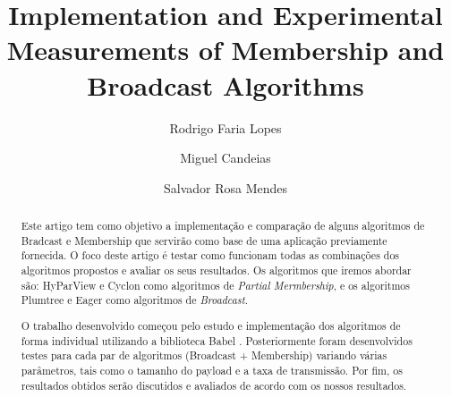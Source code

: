 \documentclass[sigconf]{acmart}
\begin{document}
\title{Implementation and Experimental Measurements of Membership and Broadcast Algorithms}

\author{Rodrigo Faria Lopes}

\author{Miguel Candeias}

\author{Salvador Rosa Mendes}

\renewcommand{\shortauthors}{Lopes, Candeias, and Mendes.}

\begin{abstract}
  Este artigo tem como objetivo a implementação e comparação de alguns algoritmos de Bradcast e Membership que servirão como base de uma aplicação previamente fornecida. O foco deste artigo é testar como funcionam todas as combinações dos algoritmos propostos e avaliar os seus resultados. Os algoritmos que iremos abordar são: HyParView \cite{hyparview} e Cyclon \cite{cyclon} como algoritmos de \textit{Partial Mermbership}, e os algoritmos Plumtree \cite{plumtree} e Eager \cite{hyparview} como algoritmos de \textit{Broadcast}.
  
  O trabalho desenvolvido começou pelo estudo e implementação dos algoritmos de forma individual utilizando a biblioteca Babel \cite{babel}. Posteriormente foram desenvolvidos testes para cada par de algoritmos (Broadcast + Membership) variando várias parâmetros, tais como o tamanho do payload e a taxa de transmissão. Por fim, os resultados obtidos serão discutidos e avaliados de acordo com os nossos resultados.
\end{abstract}
\end{document}
